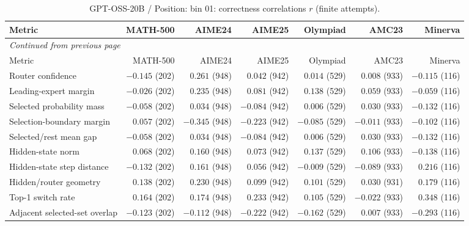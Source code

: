 \begingroup\scriptsize\setlength{\tabcolsep}{4pt}
\begin{longtable}{@{}lrrrrrr@{}}
\caption{GPT-OSS-20B / Position: bin 01: correctness correlations $r$ (finite attempts).}\label{tab:multi-gptoss-position-bin_01}\\
\toprule
Metric & MATH-500 & AIME24 & AIME25 & Olympiad & AMC23 & Minerva \\
\midrule\endfirsthead
\multicolumn{7}{l}{\textit{Continued from previous page}}\\
\toprule
Metric & MATH-500 & AIME24 & AIME25 & Olympiad & AMC23 & Minerva \\
\midrule\endhead
\bottomrule\endfoot
Router confidence & $-0.145$ (202) & $0.261$ (948) & $0.042$ (942) & $0.014$ (529) & $0.008$ (933) & $-0.115$ (116) \\
Leading-expert margin & $-0.026$ (202) & $0.235$ (948) & $0.081$ (942) & $0.138$ (529) & $0.059$ (933) & $-0.059$ (116) \\
Selected probability mass & $-0.058$ (202) & $0.034$ (948) & $-0.084$ (942) & $0.006$ (529) & $0.030$ (933) & $-0.132$ (116) \\
Selection-boundary margin & $0.057$ (202) & $-0.345$ (948) & $-0.223$ (942) & $-0.085$ (529) & $-0.011$ (933) & $-0.102$ (116) \\
Selected/rest mean gap & $-0.058$ (202) & $0.034$ (948) & $-0.084$ (942) & $0.006$ (529) & $0.030$ (933) & $-0.132$ (116) \\
Hidden-state norm & $0.068$ (202) & $0.160$ (948) & $0.073$ (942) & $0.137$ (529) & $0.106$ (933) & $-0.138$ (116) \\
Hidden-state step distance & $-0.132$ (202) & $0.161$ (948) & $0.056$ (942) & $-0.009$ (529) & $-0.089$ (933) & $0.216$ (116) \\
Hidden/router geometry & $0.138$ (202) & $0.230$ (948) & $0.099$ (942) & $0.101$ (529) & $0.030$ (931) & $0.179$ (116) \\
Top-1 switch rate & $0.164$ (202) & $0.174$ (948) & $0.233$ (942) & $0.105$ (529) & $-0.022$ (933) & $0.348$ (116) \\
Adjacent selected-set overlap & $-0.123$ (202) & $-0.112$ (948) & $-0.222$ (942) & $-0.162$ (529) & $0.007$ (933) & $-0.293$ (116) \\
\end{longtable}\endgroup

